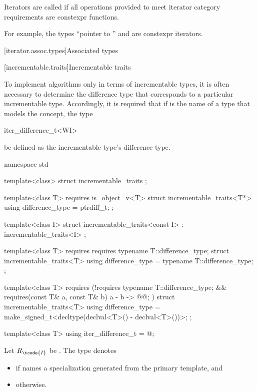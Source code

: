 \pnum
Iterators are called 
if all operations provided to meet iterator category requirements
are constexpr functions.
\begin{note}
For example, the types ``pointer to '' and
 are constexpr iterators.
\end{note}

[iterator.assoc.types]{Associated types}

[incrementable.traits]{Incrementable traits}

\pnum
To implement algorithms only in terms of incrementable types,
it is often necessary to determine the difference type that
corresponds to a particular incrementable type. Accordingly,
it is required that if  is the name of a type that models the
 concept,
the type
\begin{codeblock}
iter_difference_t<WI>
\end{codeblock}
be defined as the incrementable type's difference type.

%
\begin{codeblock}
namespace std {
  template<class> struct incrementable_traits { };

  template<class T>
    requires is_object_v<T>
  struct incrementable_traits<T*> {
    using difference_type = ptrdiff_t;
  };

  template<class I>
  struct incrementable_traits<const I>
    : incrementable_traits<I> { };

  template<class T>
    requires requires { typename T::difference_type; }
  struct incrementable_traits<T> {
    using difference_type = typename T::difference_type;
  };

  template<class T>
    requires (!requires { typename T::difference_type; } &&
              requires(const T& a, const T& b) { { a - b } -> @@; })
  struct incrementable_traits<T> {
    using difference_type = make_signed_t<decltype(declval<T>() - declval<T>())>;
  };

  template<class T>
    using iter_difference_t = @\seebelow@;
}
\end{codeblock}

%
\pnum
Let $R_\tcode{I}$ be .
The type  denotes
\begin{itemize}
\item
{}
if  names a specialization
generated from the primary template, and

\item
{} otherwise.
\end{itemize}

